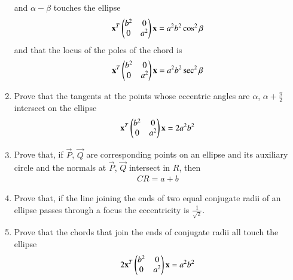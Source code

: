 \begin{enumerate}[label=\arabic*.,ref=\thesubsection.\theenumi]
and $\alpha-\beta$ touches the
ellipse
\begin{align}
\mathbf{x}^T\begin{pmatrix}b^2 & 0\\0 & a^2\end{pmatrix}\mathbf{x} =a^2b^2\cos^2\beta
\end{align}
and that the locus of the poles of the chord is
\begin{align}
\mathbf{x}^T\begin{pmatrix}b^2 & 0\\0 & a^2\end{pmatrix}\mathbf{x} =a^2b^2\sec^2\beta
\end{align}
\item Prove that the tangents at the points whose eccentric angles are $\alpha$, $\alpha+\frac{\pi}{2}$ intersect on the ellipse
\begin{align}
\mathbf{x}^T\begin{pmatrix}b^2 & 0\\0 & a^2\end{pmatrix}\mathbf{x} =2a^2b^2
\end{align}
\item Prove that, if $\vec{P}$, $\vec{Q}$ are corresponding points on an ellipse and its auxiliary circle and the normals
at $\vec{P}$, $\vec{Q}$ intersect in $R$, then
\begin{align}
CR = a+b
\end{align}
\item Prove that, if the line joining the ends of two equal conjugate radii of an ellipse passes through
a focus the eccentricity is $\frac{1}{\sqrt{2}}$.
\item Prove that the chords that join the ends of conjugate radii all touch the ellipse
\begin{align}
2\mathbf{x}^T\begin{pmatrix}b^2 & 0\\0 & a^2\end{pmatrix}\mathbf{x} =a^2b^2
\end{align}

\end{enumerate}
